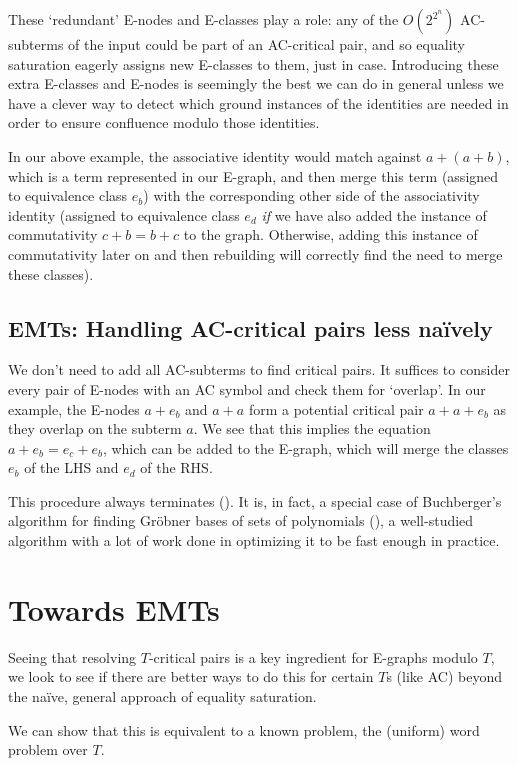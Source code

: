 \documentclass{article}
\theoremstyle{definition}
\begin{document}
These `redundant' E-nodes and E-classes play a role: any of the $O(2^{2^n})$ AC-subterms of the input could be part of an AC-critical pair, and so equality saturation eagerly assigns new E-classes to them, just in case. Introducing these extra E-classes and E-nodes is seemingly the best we can do in general unless we have a clever way to detect which ground instances of the identities are needed in order to ensure confluence modulo those identities.

In our above example, the associative identity would match against $a + (a + b)$, which is a term represented in our E-graph, and then merge this term (assigned to equivalence class $e_b$) with the corresponding other side of the associativity identity (assigned to equivalence class $e_d$  \emph{if} we have also added the instance of commutativity $c + b = b + c$ to the graph. Otherwise, adding this instance of commutativity later on and then rebuilding will correctly find the need to merge these classes).

\subsection{EMTs: Handling AC-critical pairs less na\"ively}
We don't need to add all AC-subterms to find critical pairs. It suffices to consider every pair of E-nodes with an AC symbol and check them for `overlap'. In our example, the E-nodes $a + e_b$ and $a + a$ form a potential critical pair $a + a + e_b$ as they overlap on the subterm $a$. We see that this implies the equation $a + e_b = e_c + e_b$, which can be added to the E-graph, which will merge the classes $e_b$ of the LHS and $e_d$ of the RHS.

This procedure always terminates (\citep{bachmair_abstract_2000_short}). It is, in fact, a special case of Buchberger's algorithm for finding Gr\"obner bases of sets of polynomials (\citep{tiwari_decision_2000_short}), a well-studied algorithm with a lot of work done in optimizing it to be fast enough in practice.

\section{Towards EMTs}
Seeing that resolving $T$-critical pairs is a key ingredient for E-graphs modulo $T$, we look to see if there are better ways to do this for certain $T$s (like AC) beyond the na\"ive, general approach of equality saturation.

We can show that this is equivalent to a known problem, the (uniform) word problem over $T$.
\end{document}
